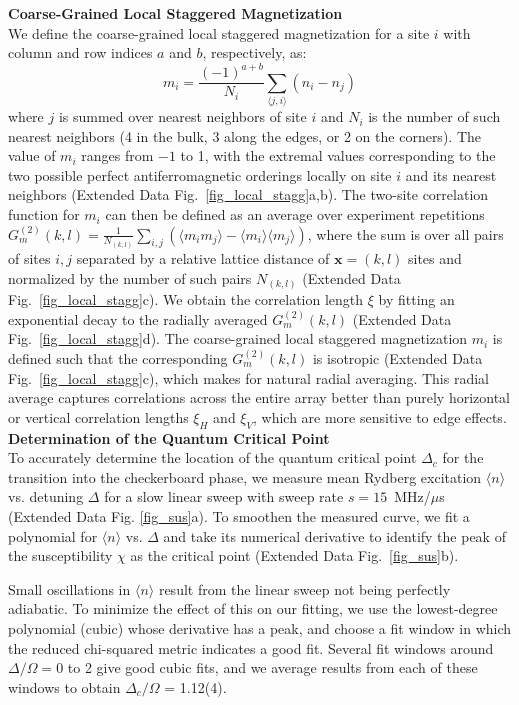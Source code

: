 \documentclass[reprint,twocolumn,secnumarabic,amssymb, aps, prl]{revtex4-1}
\begin{document}
\noindent\textbf{Coarse-Grained Local Staggered Magnetization}\\
We define the coarse-grained local staggered magnetization for a site $i$ with column and row indices $a$ and $b$, respectively, as:
$$m_i = \frac{(-1)^{a+b}}{N_i} \sum_{\langle j, i \rangle} (n_i - n_j)$$ where $j$ is summed over nearest neighbors of site $i$ and $N_i$ is the number of such nearest neighbors (4 in the bulk, 3 along the edges, or 2 on the corners).
The value of $m_i$ ranges from $-1$ to 1, with the extremal values corresponding to the two possible perfect antiferromagnetic orderings locally on site $i$ and its nearest neighbors (Extended Data Fig.~\ref{fig_local_stagg}a,b).
The two-site correlation function for $m_i$ can then be defined as an average over experiment repetitions $G^{(2)}_m(k,l) = \frac{1}{N_{(k,l)}} \sum_{i,j} (\langle m_i m_j\rangle - \langle m_i\rangle \langle m_j\rangle)$, where the sum is over all pairs of sites $i, j$ separated by a relative lattice distance of $\mathbf{x} = (k, l)$ sites and normalized by the number of such pairs $N_{(k,l)}$ (Extended Data Fig.~\ref{fig_local_stagg}c). We obtain the correlation length $\xi$ by fitting an exponential decay to the radially averaged $G^{(2)}_m(k,l)$ (Extended Data Fig.~\ref{fig_local_stagg}d). The coarse-grained local staggered magnetization $m_i$ is defined such that the corresponding $G^{(2)}_m(k,l)$ is isotropic (Extended Data Fig.~\ref{fig_local_stagg}c), which makes for natural radial averaging. This radial average captures correlations across the entire array better than purely horizontal or vertical correlation lengths $\xi_H$ and $\xi_V$, which are more sensitive to edge effects.\\

\noindent\textbf{Determination of the Quantum Critical Point}\\
To accurately determine the location of the quantum critical point $\Delta_c$ for the transition into the checkerboard phase, we measure mean Rydberg excitation $\langle n \rangle$ vs. detuning $\Delta$ for a slow linear sweep with sweep rate $s = 15$~MHz/$\mu$s (Extended Data Fig. \ref{fig_sus}a). To smoothen the measured curve, we fit a polynomial for $\langle n \rangle$ vs. $\Delta$ and take its numerical derivative to identify the peak of the susceptibility $\chi$ as the critical point\cite{SachdevQPT} (Extended Data Fig.~\ref{fig_sus}b).

Small oscillations in $\langle n \rangle$ result from the linear sweep not being perfectly adiabatic. To minimize the effect of this on our fitting, we use the lowest-degree polynomial (cubic) whose derivative has a peak, and choose a fit window in which the reduced chi-squared metric indicates a good fit. Several fit windows around $\Delta/\Omega = 0$ to 2 give good cubic fits, and we average results from each of these windows to obtain $\Delta_c/\Omega$ = 1.12(4).
\end{document}

